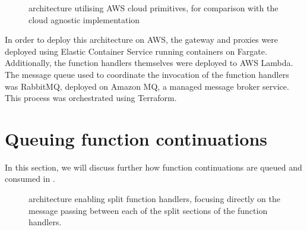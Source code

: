 \begin{figure*}
    \centering
    \caption{\faaas{} architecture utilising AWS cloud primitives, for comparison with the cloud agnostic \faaastime{} implementation}
    \label{fig:faaas-arch}
\end{figure*}

In order to deploy this architecture on AWS, the gateway and proxies were deployed using Elastic Container Service running containers on Fargate. Additionally, the function handlers themselves were deployed to AWS Lambda. The message queue used to coordinate the invocation of the function handlers was RabbitMQ, deployed on Amazon MQ, a managed message broker service. This process was orchestrated using Terraform.

\section{Queuing function continuations}
In this section, we will discuss further how function continuations are queued and consumed in \faaas{}.

\begin{figure}
    \centering
    \quad
    \caption{\faas{} architecture enabling split function handlers, focusing directly on the message passing between each of the split sections of the function handlers.}
\end{figure}

